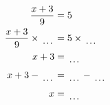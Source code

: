 \documentclass[12pt]{article}
\begin{document}
\begin{multicols}{2}
\begin{minipage}[t]{0.45\textwidth}
    \raggedright %
    \begin{align*} %
        \frac{x + 3}{9} &= 5\\
        \frac{x + 3}{9} \times\dotuline{\hspace{5mm}} &= 5 \times\dotuline{\hspace{5mm}}\\
        x + 3 &= \dotuline{\hspace{5mm}}\\
        x + 3 - \dotuline{\hspace{5mm}} &= \dotuline{\hspace{5mm}} - \dotuline{\hspace{5mm}}\\
        x &= \dotuline{\hspace{5mm}}\\
    \end{align*}
\end{minipage}\newpage

\end{multicols}
\end{document}
